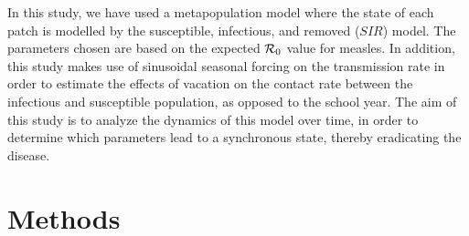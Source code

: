 \documentclass[twocolumn,nofootinbib,showkeys,twoside,floatfix,unsortedaddress,flushbottom,10pt,aps,pra]{report}
\begin{document}
\par
\smallskip \qquad
In this study, we have used a metapopulation model where the state of each patch is modelled by the susceptible, infectious, and removed ($SIR$) model. The parameters chosen are based on the expected ${\cal R}_0$ value for measles. In addition, this study makes use of sinusoidal seasonal forcing on the transmission rate in order to estimate the effects of vacation on the contact rate between the infectious and susceptible population, as opposed to the school year. The aim of this study is to analyze the dynamics of this model over time, in order to determine which parameters lead to a synchronous state, thereby eradicating the disease. \par
\smallskip

\section{Methods}
\end{document}

